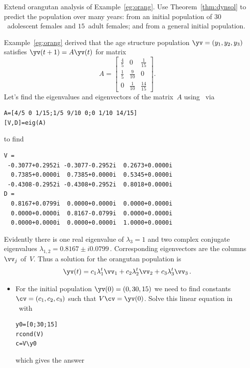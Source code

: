 \begin{example} \label{eg:orangs}
Extend orangutan analysis of Example~\ref{eg:orang}. 
Use Theorem~\ref{thm:dynsol} to predict the population over many years: from an initial population of \(30\)~adolescent females and \(15\)~adult females; and from a general initial population.
\begin{solution} 
Example~\ref{eg:orang} derived that the age structure population \(\yv=(y_1,y_2,y_3)\) satisfies \(\yv(t+1)=A\yv(t)\) for matrix
\begin{equation*}
A=\begin{bmatrix} \frac45&0&\frac1{15}
\\\frac15&\frac9{10}&0
\\0&\frac1{10}&\frac{14}{15} \end{bmatrix}.
\end{equation*}
Let's find the eigenvalues and eigenvectors of the matrix~\(A\) using \script\ via
\begin{verbatim}
A=[4/5 0 1/15;1/5 9/10 0;0 1/10 14/15]
[V,D]=eig(A)
\end{verbatim}
\setbox\ajrqrbox\hbox{}%
\marginpar{\usebox{\ajrqrbox}}%
to find
\begin{verbatim}
V =
 -0.3077+0.2952i -0.3077-0.2952i  0.2673+0.0000i
  0.7385+0.0000i  0.7385+0.0000i  0.5345+0.0000i
 -0.4308-0.2952i -0.4308+0.2952i  0.8018+0.0000i
D =
  0.8167+0.0799i  0.0000+0.0000i  0.0000+0.0000i
  0.0000+0.0000i  0.8167-0.0799i  0.0000+0.0000i
  0.0000+0.0000i  0.0000+0.0000i  1.0000+0.0000i
\end{verbatim}
Evidently there is one real eigenvalue of \(\lambda_3=1\) and two complex conjugate eigenvalues \(\lambda_{1,2}=0.8167\pm i0.0799\)\,.
Corresponding eigenvectors are the columns~\(\vv_j\) of~\(V\).
Thus a solution for the orangutan population is
\begin{equation*}
\yv(t)=c_1\lambda_1^t\vv_1+c_2\lambda_2^t\vv_2+c_3\lambda_3^t\vv_3\,.
\end{equation*}
\begin{itemize}
\item For the initial population \(\yv(0)=(0,30,15)\) we need to find constants \(\cv=(c_1,c_2,c_3)\) such that \(V\cv=\yv(0)\).
Solve this linear equation in \script\ with 
\begin{verbatim}
y0=[0;30;15]
rcond(V)
c=V\y0
\end{verbatim}
which gives the answer

\end{itemize}
\end{solution}
\end{example}

